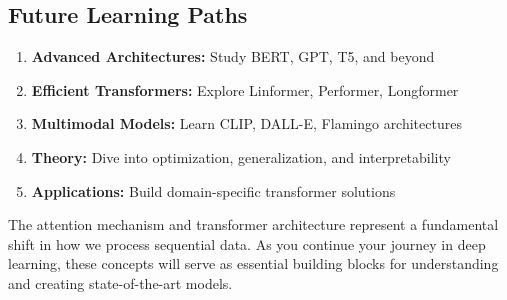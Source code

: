 \subsection{Future Learning Paths}

\begin{enumerate}
    \item \textbf{Advanced Architectures:} Study BERT, GPT, T5, and beyond
    \item \textbf{Efficient Transformers:} Explore Linformer, Performer, Longformer
    \item \textbf{Multimodal Models:} Learn CLIP, DALL-E, Flamingo architectures
    \item \textbf{Theory:} Dive into optimization, generalization, and interpretability
    \item \textbf{Applications:} Build domain-specific transformer solutions
\end{enumerate}

The attention mechanism and transformer architecture represent a fundamental shift in how we process sequential data. As you continue your journey in deep learning, these concepts will serve as essential building blocks for understanding and creating state-of-the-art models.

